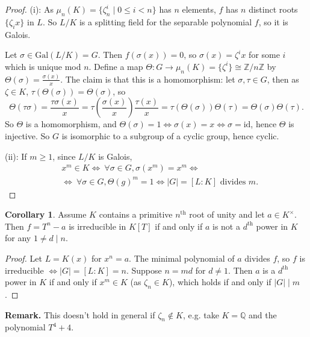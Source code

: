 \documentclass{article}
\theoremstyle{definition}
\newtheorem{cor}[theorem]{Corollary}
\begin{document}
\begin{proof}
    (i): As $\mu_n(K) = \{\zeta_n^i \mid 0\le i<n\}$ has $n$ elements, $f$ has $n$ distinct roots $\{\zeta_i x\}$ in $L$. So $L/K$ is a splitting field for the separable polynomial $f$, so it is Galois.

    Let $\sigma \in \text{Gal}(L/K) = G$. Then $f(\sigma(x))=0$, so $\sigma(x) = \zeta^i x$ for some $i$ which is unique mod $n$. Define a map $\Theta : G \to \mu_n(K)=\{\zeta^i\} \cong \mathbb{Z}/n\mathbb{Z}$ by $\Theta(\sigma) = \frac{\sigma(x)}{x}$. The claim is that this is a homomorphism: let $\sigma, \tau \in G$, then as $\zeta \in K$, $\tau(\Theta(\sigma))=\Theta(\sigma)$, so \[
    \Theta(\tau \sigma) = \frac{\tau \sigma(x)}{x} = \tau\left(\frac{\sigma(x)}{x}\right)  \frac{\tau(x)}{x} = \tau(\Theta(\sigma))\Theta(\tau)=\Theta(\sigma)\Theta(\tau).
    \]
    So $\Theta$ is a homomorphism, and $\Theta(\sigma)=1 \iff \sigma(x)=x \iff \sigma=\text{id}$, hence $\Theta$ is injective. So $G$ is isomorphic to a subgroup of a cyclic group, hence cyclic.
    \vspace{1mm}
    
    (ii): If $m\ge 1$, since $L/K$ is Galois,
    \begin{align*}
        &x^m \in K \iff ~\forall \sigma \in G, \sigma(x^m)=x^m \iff\\
        &\iff ~\forall \sigma \in G,\Theta(g)^m = 1 \iff |G|=[L:K] \text{ divides }m.
    \end{align*}
\end{proof}
\begin{cor}
    Assume $K$ contains a primitive $n^{\text{th}}$ root of unity and let $a \in K^\times$. Then $f=T^n-a$ is irreducible in $K[T]$ if and only if $a$ is not a $d^{\text{th}}$ power in $K$ for any $1 \neq d \mid n$.
\end{cor}
\begin{proof}
    Let $L=K(x)$ for $x^n=a$. The minimal polynomial of $a$ divides $f$, so $f$ is irreducible $\iff |G|=[L:K]=n$. Suppose $n=md$ for $d \neq 1$. Then $a$ is a $d^{\text{th}}$ power in $K$ if and only if $x^m \in K$ (as $\zeta_n \in K$), which holds if and only if $|G| \mid m$.
\end{proof}
\textbf{Remark.} This doesn't hold in general if $\zeta_n \not\in K$, e.g. take $K=\mathbb{Q}$ and the polynomial $T^4+4$.
\vspace{1mm}
\end{document}
